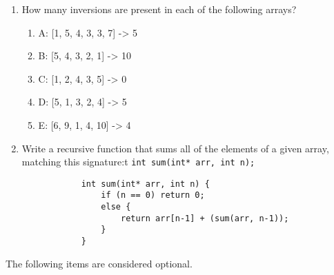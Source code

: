 \documentclass[11pt]{article}
\begin{document}
\begin{enumerate}
        \item How many inversions are present in each of the following arrays?
        \begin{enumerate}
            \item[] A: [1, 5, 4, 3, 3, 7] -> 5
            \item[] B: [5, 4, 3, 2, 1] -> 10
            \item[] C: [1, 2, 4, 3, 5] -> 0
            \item[] D: [5, 1, 3, 2, 4] -> 5
            \item[] E: [6, 9, 1, 4, 10] -> 4
        \end{enumerate}
    
        \item Write a recursive function that sums all of the elements of a given array, matching this signature:t \lstinline{int sum(int* arr, int n);}
        \begin{lstlisting}
            int sum(int* arr, int n) {
                if (n == 0) return 0;
                else {
                    return arr[n-1] + (sum(arr, n-1));
                }
            }
        \end{lstlisting}
        
    \end{enumerate}
    
    The following items are considered optional.
    
\end{document}
